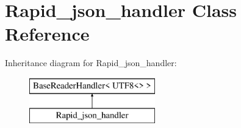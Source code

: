 \hypertarget{classRapid__json__handler}{}\section{Rapid\+\_\+json\+\_\+handler Class Reference}
\label{classRapid__json__handler}
Inheritance diagram for Rapid\+\_\+json\+\_\+handler\+:\begin{figure}[H]
\begin{center}
\leavevmode
\includegraphics[height=2.000000cm]{classRapid__json__handler}
\end{center}
\end{figure}
